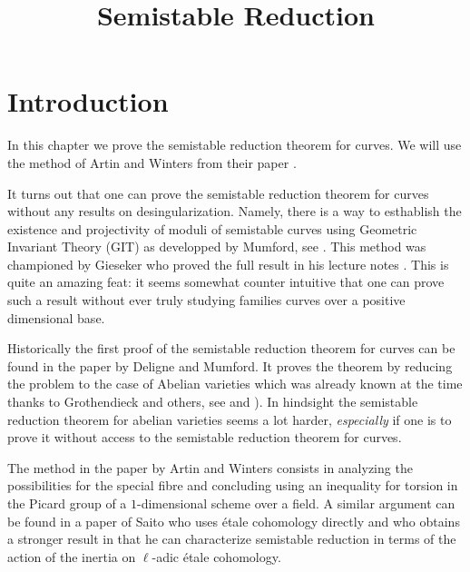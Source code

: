 

%


\title{Semistable Reduction}


\maketitle

\label{section-phantom}

\tableofcontents

\section{Introduction}
\label{section-introduction}

\noindent
In this chapter we prove the semistable reduction theorem for curves.
We will use the method of Artin and Winters from their paper
\cite{Artin-Winters}.

\medskip\noindent
It turns out that one can prove the semistable reduction theorem
for curves without any results on desingularization. Namely, there
is a way to esthablish the existence and projectivity of moduli
of semistable curves using Geometric Invariant Theory (GIT)
as developped by Mumford, see \cite{GIT}. This method was
championed by Gieseker who proved the full result in his
lecture notes \cite{Gieseker}. This is quite an amazing
feat: it seems somewhat counter intuitive that one can
prove such a result without ever truly studying families curves over
a positive dimensional base.

\medskip\noindent
Historically the first proof of the semistable reduction theorem
for curves can be found in the paper \cite{DM} by Deligne and Mumford.
It proves the theorem by reducing the problem to the case of
Abelian varieties which was already known at the time thanks
to Grothendieck and others, see \cite{SGA7-I} and \cite{SGA7-II}).
In hindsight the semistable reduction theorem for abelian varieties seems
a lot harder, {\it especially} if one is to prove it without access
to the semistable reduction theorem for curves.

\medskip\noindent
The method in the paper by Artin and Winters consists in analyzing the
possibilities for the special fibre and concluding using an inequality
for torsion in the Picard group of a $1$-dimensional scheme over a field.
A similar argument can be found in a paper \cite{Saito} of Saito who uses
\'etale cohomology directly and who obtains a stronger result in that
he can characterize semistable reduction in terms of the action of
the inertia on $\ell$-adic \'etale cohomology.

